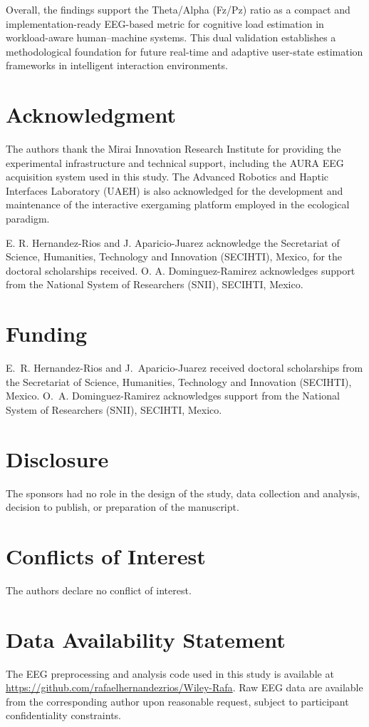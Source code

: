 \documentclass[10pt]{iopart}
\begin{document}
Overall, the findings support the Theta/Alpha (Fz/Pz) ratio as a compact and implementation-ready EEG-based metric for cognitive load estimation in workload-aware human--machine systems. This dual validation establishes a methodological foundation for future real-time and adaptive user-state estimation frameworks in intelligent interaction environments.



\section*{Acknowledgment}
The authors thank the Mirai Innovation Research Institute for providing the experimental infrastructure and technical support, including the AURA EEG acquisition system used in this study. The Advanced Robotics and Haptic Interfaces Laboratory (UAEH) is also acknowledged for the development and maintenance of the interactive exergaming platform employed in the ecological paradigm.

E. R. Hernandez-Rios and J. Aparicio-Juarez acknowledge the Secretariat of Science, Humanities, Technology and Innovation (SECIHTI), Mexico, for the doctoral scholarships received. O. A. Dominguez-Ramirez acknowledges support from the National System of Researchers (SNII), SECIHTI, Mexico.

\section*{Funding}
E.~R. Hernandez-Rios and J.~Aparicio-Juarez received doctoral
scholarships from the Secretariat of Science, Humanities,
Technology and Innovation (SECIHTI), Mexico.
O.~A. Dominguez-Ramirez acknowledges support from the
National System of Researchers (SNII), SECIHTI, Mexico.

\section*{Disclosure}
The sponsors had no role in the design of the study,
data collection and analysis, decision to publish,
or preparation of the manuscript.

\section*{Conflicts of Interest}
The authors declare no conflict of interest.

\section*{Data Availability Statement}
The EEG preprocessing and analysis code used in this study
is available at \url{https://github.com/rafaelhernandezrios/Wiley-Rafa}.
Raw EEG data are available from the corresponding author upon
reasonable request, subject to participant confidentiality
constraints.
\end{document}
